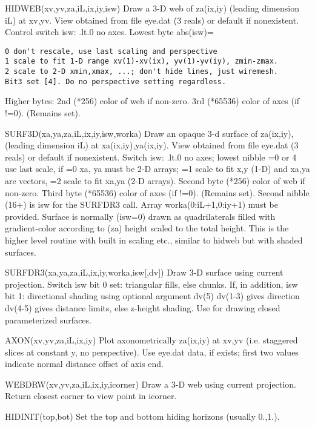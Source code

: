 \documentclass[12pt]{article}
\newif \iftth
\begin{document}
\iftth \special{html:<a href="hidtest.f"><img align="right" src="hidtest.png"></a>}\fi

HIDWEB(xv,yv,za,iL,ix,iy,isw) Draw a 3-D web of za(ix,iy) (leading
dimension iL) at xv,yv.  View obtained from file eye.dat (3 reals) or
default if nonexistent. Control switch isw: .lt.0 no axes.
Lowest byte abs(isw)=
\begin{verbatim}
0 don't rescale, use last scaling and perspective
1 scale to fit 1-D range xv(1)-xv(ix), yv(1)-yv(iy), zmin-zmax.
2 scale to 2-D xmin,xmax, ...; don't hide lines, just wiremesh.
Bit3 set [4]. Do no perspective setting regardless.
\end{verbatim}

Higher bytes: {2nd} (*256) color of web if non-zero. {3rd} (*65536) color
of axes (if !=0). (Remains set).

SURF3D(xa,ya,za,iL,ix,iy,isw,worka) Draw an opaque 3-d surface of
za(ix,iy), (leading dimension iL) at xa(ix,iy),ya(ix,iy).  View
obtained from file eye.dat (3 reals) or default if nonexistent. Switch
isw: .lt.0 no axes; lowest nibble =0 or 4 use last scale, if =0 xa, ya
must be 2-D arrays; =1 scale to fit x,y (1-D) and xa,ya are vectors,
=2 scale to fit xa,ya (2-D arrays). Second byte (*256) color of web if
non-zero. Third byte (*65536) color of axes (if !=0). (Remains
set). Second nibble (16+) is isw for the SURFDR3 call. Array
worka(0:iL+1,0:iy+1) must be provided.  Surface is normally (isw=0)
drawn as quadrilaterals filled with gradient-color according to (za)
height scaled to the total height. This is the higher level routine
with built in scaling etc., similar to hidweb but with shaded surfaces.

SURFDR3(xa,ya,za,iL,ix,iy,worka,isw[,dv]) Draw 3-D surface using current
projection. Switch isw bit 0 set: triangular fills, else chunks.  If,
in addition, isw bit 1: directional shading using optional argument
dv(5) dv(1-3) gives direction dv(4-5) gives distance limits, else
z-height shading. Use for drawing closed parameterized surfaces.

AXON(xv,yv,za,iL,ix,iy) Plot axonometrically za(ix,iy) at xv,yv (i.e.
staggered slices at constant y, no perspective).  Use eye.dat data, if
exists; first two values indicate normal distance offset of axis end.

WEBDRW(xv,yv,za,iL,ix,iy,icorner) Draw  a 3-D web using current projection.
Return closest corner to view point in icorner.

HIDINIT(top,bot) Set the top and bottom hiding horizons (usually 0.,1.).
\end{document}
